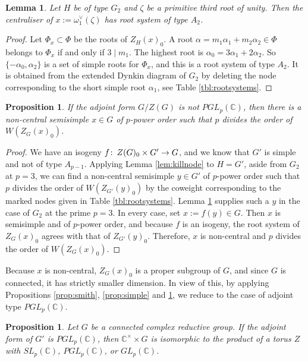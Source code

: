 \documentclass[oneside, 12pt, a4paper]{amsart}
\numberwithin{equation}{section}
\newcommand{\C}{\mathbb{C}}
\newcommand{\co}{\colon\thinspace}
\theoremstyle{plain}
\newtheorem{proposition}[theorem]{Proposition}
\newtheorem{lemma}[theorem]{Lemma}
\theoremstyle{definition}
\theoremstyle{remark}
\begin{document}
\begin{lemma} \label{lem:g2}
Let $H$ be of type $G_2$ and $\zeta$ be a primitive third root of unity. Then the centraliser of $x:=\omega_1^\vee(\zeta)$ has root system of type $A_2$.
\end{lemma}
\begin{proof}
Let $\Phi_x\subset \Phi$ be the roots of $Z_H(x)_0$. A root $\alpha=m_1\alpha_1+m_2\alpha_2\in \Phi$ belongs to $\Phi_x$ if and only if $3\mid m_1$. The highest root is $\alpha_0=3\alpha_1+2\alpha_2$. So $\{-\alpha_0,\alpha_2\}$ is a set of simple roots for $\Phi_x$, and this is a root system of type $A_2$. It is obtained from the extended Dynkin diagram of $G_2$ by deleting the node corresponding to the short simple root $\alpha_1$, see Table \ref{tbl:rootsystems}.
\end{proof}

\begin{proposition} \label{prop:centraliser}
    If the adjoint form $G/Z(G)$ is not $PGL_p(\C)$, then there is a non-central semisimple $x\in G$ of $p$-power order such that $p$ divides the order of $W(Z_G(x)_0)$.
\end{proposition}
\begin{proof}
We have an isogeny $f\co Z(G)_0\times G'\to G$, and we know that $G'$ is simple and not of type $A_{p-1}$. Applying Lemma \ref{lem:killnode} to $H=G'$, aside from $G_2$ at $p=3$, we can find a non-central semisimple $y\in G'$ of $p$-power order such that $p$ divides the order of $W(Z_{G'}(y)_0)$ by the coweight corresponding to the marked nodes given in Table \ref{tbl:rootsystems}. Lemma \ref{lem:g2} supplies such a $y$ in the case of $G_2$ at the prime $p=3$. In every case, set $x:=f(y)\in G$. Then $x$ is semisimple and of $p$-power order, and because $f$ is an isogeny, the root system of $Z_G(x)_0$ agrees with that of $Z_{G'}(y)_0$. Therefore, $x$ is non-central and $p$ divides the order of $W(Z_G(x)_0)$.
\end{proof}



Because $x$ is non-central, $Z_G(x)_0$ is a proper subgroup of $G$, and since $G$ is connected, it has strictly smaller dimension. In view of this, by applying Propositions \ref{prop:smith}, \ref{prop:simple} and \ref{prop:centraliser}, we reduce to the case of adjoint type $PGL_p(\C)$.
\begin{proposition} \label{prop:basecase}
Let $G$ be a connected complex reductive group. If the adjoint form of $G'$ is $PGL_p(\C)$, then $\C^\times \times G$ is isomorphic to the product of a torus $Z$ with $SL_p(\C)$, $PGL_p(\C)$, or $GL_p(\C)$.
\end{proposition}
\end{document}

